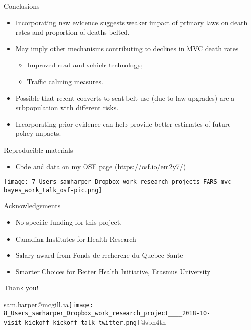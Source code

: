 \documentclass[english]{beamer}\usepackage[]{graphicx}\usepackage[]{color}
\begin{document}
\begin{frame}{Conclusions}
\begin{itemize}
\item Incorporating new evidence suggests weaker impact of primary laws
on death rates and proportion of deaths belted.\medskip{}
\item<2-> May imply other mechanisms contributing to declines in MVC death
rates
\begin{itemize}
\item Improved road and vehicle technology;
\item Traffic calming measures.\medskip{}
\end{itemize}
\item<3-> Possible that recent converts to seat belt use (due to law upgrades)
are a subpopulation with different risks.

\medskip{}

\item<4-> Incorporating prior evidence can help provide better estimates of
future policy impacts. 
\end{itemize}
\end{frame}
%
\begin{frame}{Reproducible materials}
\begin{itemize}
\item Code and data on my OSF page (https://osf.io/em2y7/)
\end{itemize}
\begin{center}
\texttt{[image: 7\_Users\_samharper\_Dropbox\_work\_research\_projects\_FARS\_mvc-bayes\_work\_talk\_osf-pic.png]}
\par\end{center}

\end{frame}
%
\begin{frame}{Acknowledgements}

\begin{itemize}
\item No specific funding for this project.\medskip{}
\item Canadian Institutes for Health Research\medskip{}
\item Salary award from Fonds de recherche du Quebec \textendash{} Sante\medskip{}
\item Smarter Choices for Better Health Initiative, Erasmus University

\noindent {\large{}\bigskip{}
}{\large \par}
\end{itemize}
\noindent \begin{center}
{\large{}Thank you!}
\par\end{center}{\large \par}

\noindent \begin{center}
{\large{}sam.harper@mcgill.ca\qquad{}\texttt{[image: 8\_Users\_samharper\_Dropbox\_work\_research\_project\_\_\_\_2018-10-visit\_kickoff\_kickoff-talk\_twitter.png]}@sbh4th}
\par\end{center}{\large \par}

\end{frame}
%
\end{document}
